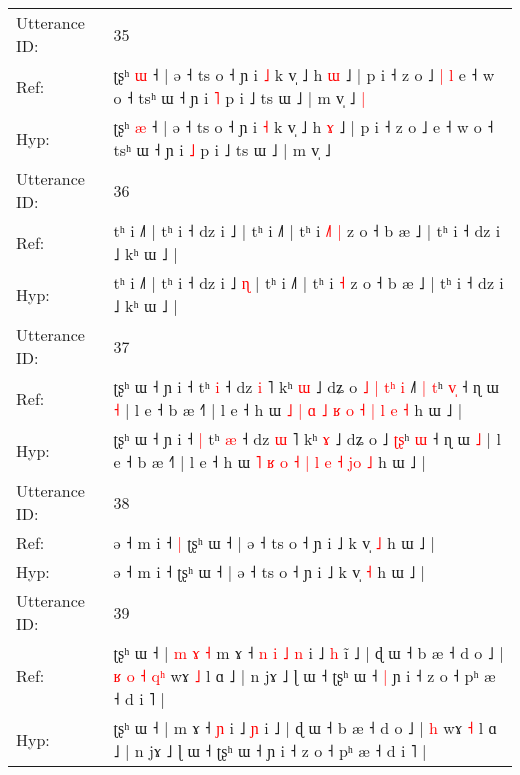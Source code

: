 \documentclass[10pt]{article}
\DeclareRobustCommand{\hl}[1]{{\textcolor{red}{#1}}}
\begin{document}
\begin{longtable}{ll}
\midrule
Utterance ID: & 35 \\
Ref: & ʈʂʰ \hl{ɯ} ˧ | ə ˧ ts o ˧ ɲ i \hl{˩} k v̩ ˩ h \hl{ɯ} ˩ | p i ˧ z o ˩\hl{ }\hl{|}\hl{ }\hl{l} e ˧ w o ˧ tsʰ ɯ ˧ ɲ i \hl{˥} p i ˩ ts ɯ ˩ | m v̩ ˩\hl{ }\hl{|}
 \\
Hyp: & ʈʂʰ \hl{æ} ˧ | ə ˧ ts o ˧ ɲ i \hl{˧} k v̩ ˩ h \hl{ɤ} ˩ | p i ˧ z o ˩\hl{}\hl{}\hl{}\hl{} e ˧ w o ˧ tsʰ ɯ ˧ ɲ i \hl{˩} p i ˩ ts ɯ ˩ | m v̩ ˩\hl{}\hl{}
 \\
\midrule
Utterance ID: & 36 \\
Ref: & tʰ i ˩˥ | tʰ i ˧ dz i ˩\hl{}\hl{} | tʰ i ˩˥ | tʰ i\hl{ }\hl{˩}\hl{˥} \hl{|} z o ˧ b æ ˩ | tʰ i ˧ dz i ˩ kʰ ɯ ˩ |
 \\
Hyp: & tʰ i ˩˥ | tʰ i ˧ dz i ˩\hl{ }\hl{ɳ} | tʰ i ˩˥ | tʰ i\hl{}\hl{}\hl{} \hl{˧} z o ˧ b æ ˩ | tʰ i ˧ dz i ˩ kʰ ɯ ˩ |
 \\
\midrule
Utterance ID: & 37 \\
Ref: & ʈʂʰ ɯ ˧ ɲ i ˧\hl{}\hl{} tʰ \hl{i} ˧ dz \hl{i} ˥ kʰ \hl{ɯ} ˩ dʑ o\hl{ }\hl{˩}\hl{ }\hl{|}\hl{ }\hl{t}\hl{ʰ}\hl{ }\hl{i} ˩\hl{˥} \hl{|}\hl{ }\hl{t}ʰ \hl{v}\hl{̩} ˧ ɳ ɯ \hl{˧} | l e ˧ b æ ˧˥ | l e ˧ h ɯ \hl{˩} \hl{|} \hl{ɑ} \hl{˩} \hl{ʁ} \hl{o} \hl{˧} \hl{|} \hl{l}\hl{ }\hl{e} \hl{˧} h ɯ ˩ |
 \\
Hyp: & ʈʂʰ ɯ ˧ ɲ i ˧\hl{ }\hl{|} tʰ \hl{æ} ˧ dz \hl{ɯ} ˥ kʰ \hl{ɤ} ˩ dʑ o\hl{}\hl{}\hl{}\hl{}\hl{}\hl{}\hl{}\hl{}\hl{} ˩\hl{} \hl{}\hl{ʈ}\hl{ʂ}ʰ \hl{}\hl{ɯ} ˧ ɳ ɯ \hl{˩} | l e ˧ b æ ˧˥ | l e ˧ h ɯ \hl{˥} \hl{ʁ} \hl{o} \hl{˧} \hl{|} \hl{l} \hl{e} \hl{˧} \hl{}\hl{j}\hl{o} \hl{˩} h ɯ ˩ |
 \\
\midrule
Utterance ID: & 38 \\
Ref: & ə ˧ m i ˧\hl{ }\hl{|} ʈʂʰ ɯ ˧ | ə ˧ ts o ˧ ɲ i ˩ k v̩ \hl{˩} h ɯ ˩ |
 \\
Hyp: & ə ˧ m i ˧\hl{}\hl{} ʈʂʰ ɯ ˧ | ə ˧ ts o ˧ ɲ i ˩ k v̩ \hl{˧} h ɯ ˩ |
 \\
\midrule
Utterance ID: & 39 \\
Ref: & ʈʂʰ ɯ ˧ |\hl{ }\hl{m}\hl{ }\hl{ɤ}\hl{ }\hl{˧} m ɤ ˧\hl{ }\hl{n}\hl{ }\hl{i}\hl{ }\hl{˩} \hl{n} i ˩ \hl{h} i\hl{̃} ˩ | ɖ ɯ ˧ b æ ˧ d o ˩ |\hl{ }\hl{ʁ}\hl{ }\hl{o}\hl{ }\hl{˧} \hl{q}\hl{ʰ} wɤ \hl{˩} l ɑ ˩ | n jɤ ˩ ɭ ɯ ˧ ʈʂʰ ɯ ˧\hl{ }\hl{|} ɲ i ˧ z o ˧ pʰ æ ˧ d i ˥ |
 \\
Hyp: & ʈʂʰ ɯ ˧ |\hl{}\hl{}\hl{}\hl{}\hl{}\hl{} m ɤ ˧\hl{}\hl{}\hl{}\hl{}\hl{}\hl{} \hl{ɲ} i ˩ \hl{ɲ} i\hl{} ˩ | ɖ ɯ ˧ b æ ˧ d o ˩ |\hl{}\hl{}\hl{}\hl{}\hl{}\hl{} \hl{}\hl{h} wɤ \hl{˧} l ɑ ˩ | n jɤ ˩ ɭ ɯ ˧ ʈʂʰ ɯ ˧\hl{}\hl{} ɲ i ˧ z o ˧ pʰ æ ˧ d i ˥ |
 \\

\end{longtable}
\end{document}
